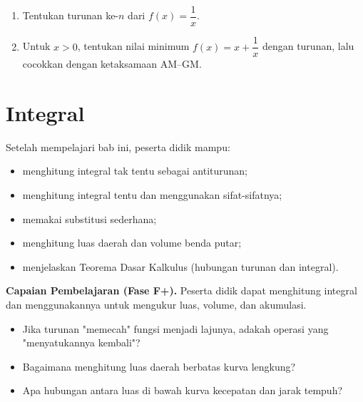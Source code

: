 \documentclass[11pt,a4paper]{report}
\theoremstyle{gaya}
\begin{document}
\begin{challenge}
\begin{enumerate}[leftmargin=*,topsep=2pt]
  \item Tentukan turunan ke-$n$ dari $f(x)=\dfrac1x$.
  \item Untuk $x>0$, tentukan nilai minimum $f(x)=x+\dfrac1x$ dengan turunan, lalu cocokkan dengan ketaksamaan AM--GM.
\end{enumerate}
\end{challenge}

\chapter{Integral}
\begin{tujuan}
Setelah mempelajari bab ini, peserta didik mampu:
\begin{itemize}[leftmargin=*,topsep=2pt]
  \item menghitung integral tak tentu sebagai antiturunan;
  \item menghitung integral tentu dan menggunakan sifat-sifatnya;
  \item memakai substitusi sederhana;
  \item menghitung luas daerah dan volume benda putar;
  \item menjelaskan Teorema Dasar Kalkulus (hubungan turunan dan integral).
\end{itemize}
\textbf{Capaian Pembelajaran (Fase F+).} Peserta didik dapat menghitung integral dan menggunakannya untuk mengukur luas, volume, dan akumulasi.
\end{tujuan}

\begin{pemantik}
\begin{itemize}[leftmargin=*,topsep=2pt]
  \item Jika turunan "memecah" fungsi menjadi lajunya, adakah operasi yang "menyatukannya kembali"?
  \item Bagaimana menghitung luas daerah berbatas kurva lengkung?
  \item Apa hubungan antara luas di bawah kurva kecepatan dan jarak tempuh?
\end{itemize}
\end{pemantik}
\end{document}
